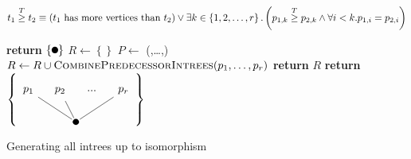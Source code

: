 \begin{equation}
  \label{eq:definition-treegeq}
  t_1 \stackrel{T}{\geq} t_2 \equiv (\text{$t_1$ has more vertices than $t_2$}) \vee \exists k \in \left\{ 1,2,\dots,r \right\}. \left( p_{1,k} \stackrel{T}{\geq} p_{2,k} \wedge \forall i<k. p_{1,i}=p_{2,i} \right)
\end{equation}


\begin{algorithm}
  \begin{algorithmic}
     
        \State \textbf{return} $\left\{ \tikz{\fill(0,0) circle (0.1cm);} \right\}$ 
      \EndIf
      \State $R \gets \left\{  \right\}$ 
        \State $P \gets$ (,\dots,) 
           
          \State $R \gets R \cup \Call{CombinePredecessorIntrees}{p_1,\dots,p_r}$
          \EndIf
        \EndFor
      \EndFor
      \State \textbf{return} $R$
    \EndProcedure
    \Statex
    \State \textbf{return} $\left\{
      \tikz[baseline=(current bounding box.center)]{
        \fill (-0.5,0)circle(0.1cm);
        \node(root) at (-0.5,0){};
        \node[circle](1) at (-2,1) {$p_1$};
        \node[circle](2) at (-1,1) {$p_2$};
        \node[circle](p) at (0,1) {...};
        \node[circle](r) at (1,1) {$p_r$};
        \draw[-] (1) -- (root);
        \draw[-] (2) -- (root);
        \draw[-] (r) -- (root);
      }
      \right\} $
    \EndProcedure
  \end{algorithmic}
  \caption{Generating all intrees up to isomorphism}
  \label{alg:generate-intrees}
\end{algorithm}


